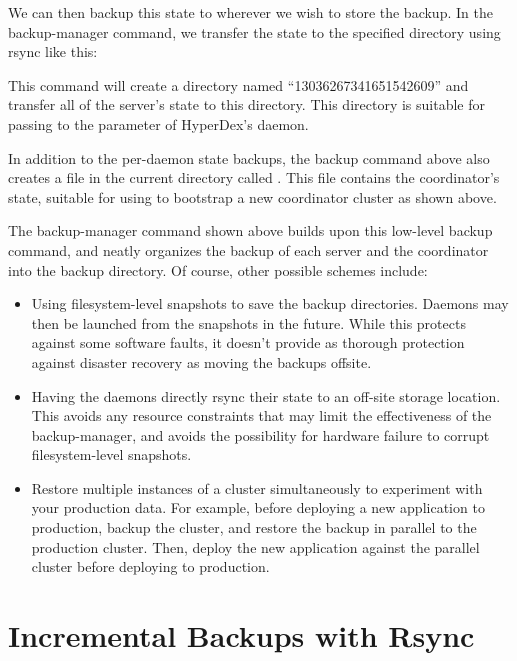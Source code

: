 We can then backup this state to wherever we wish to store the backup.  In the
backup-manager command, we transfer the state to the specified directory using
rsync like this:

\begin{consolecode}
\end{consolecode}

This command will create a directory named ``13036267341651542609'' and transfer
all of the server's state to this directory.  This directory is suitable for
passing to the  parameter of HyperDex's daemon.

In addition to the per-daemon state backups, the backup command above also
creates a file in the current directory called .
This file contains the coordinator's state, suitable for using to bootstrap a
new coordinator cluster as shown above.

The backup-manager command shown above builds upon this low-level backup
command, and neatly organizes the backup of each server and the coordinator into
the backup directory.  Of course, other possible schemes include:

\begin{itemize}
\item Using filesystem-level snapshots to save the backup directories.  Daemons
may then be launched from the snapshots in the future.  While this protects
against some software faults, it doesn't provide as thorough protection against
disaster recovery as moving the backups offsite.

\item  Having the daemons directly rsync their state to an off-site storage
location.  This avoids any resource constraints that may limit the effectiveness
of the backup-manager, and avoids the possibility for hardware failure to
corrupt filesystem-level snapshots.

\item Restore multiple instances of a cluster simultaneously to experiment with
your production data.  For example, before deploying a new application to
production, backup the cluster, and restore the backup in parallel to the
production cluster.  Then, deploy the new application against the parallel
cluster before deploying to production.
\end{itemize}

\section{Incremental Backups with Rsync}

